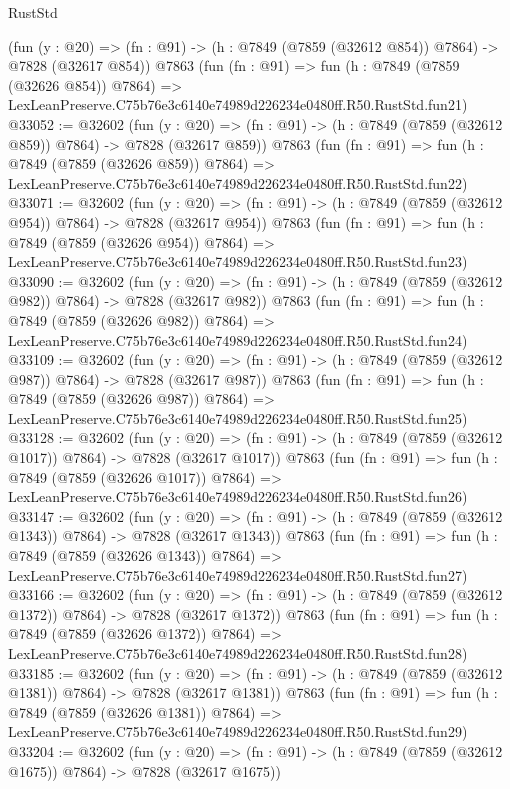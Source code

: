 \begin{lexlean}{RustStd}
\begin{coremodule}
    (fun (y : @20) => (fn : @91) -> (h : @7849 (@7859 (@32612 @854)) @7864) -> @7828 (@32617 @854))
    @7863
    (fun (fn : @91) =>
    fun (h : @7849 (@7859 (@32626 @854)) @7864) =>
    LexLeanPreserve.C75b76e3c6140e74989d226234e0480ff.R50.RustStd.fun21)
@33052 := @32602
    (fun (y : @20) => (fn : @91) -> (h : @7849 (@7859 (@32612 @859)) @7864) -> @7828 (@32617 @859))
    @7863
    (fun (fn : @91) =>
    fun (h : @7849 (@7859 (@32626 @859)) @7864) =>
    LexLeanPreserve.C75b76e3c6140e74989d226234e0480ff.R50.RustStd.fun22)
@33071 := @32602
    (fun (y : @20) => (fn : @91) -> (h : @7849 (@7859 (@32612 @954)) @7864) -> @7828 (@32617 @954))
    @7863
    (fun (fn : @91) =>
    fun (h : @7849 (@7859 (@32626 @954)) @7864) =>
    LexLeanPreserve.C75b76e3c6140e74989d226234e0480ff.R50.RustStd.fun23)
@33090 := @32602
    (fun (y : @20) => (fn : @91) -> (h : @7849 (@7859 (@32612 @982)) @7864) -> @7828 (@32617 @982))
    @7863
    (fun (fn : @91) =>
    fun (h : @7849 (@7859 (@32626 @982)) @7864) =>
    LexLeanPreserve.C75b76e3c6140e74989d226234e0480ff.R50.RustStd.fun24)
@33109 := @32602
    (fun (y : @20) => (fn : @91) -> (h : @7849 (@7859 (@32612 @987)) @7864) -> @7828 (@32617 @987))
    @7863
    (fun (fn : @91) =>
    fun (h : @7849 (@7859 (@32626 @987)) @7864) =>
    LexLeanPreserve.C75b76e3c6140e74989d226234e0480ff.R50.RustStd.fun25)
@33128 := @32602
    (fun (y : @20) =>
    (fn : @91) -> (h : @7849 (@7859 (@32612 @1017)) @7864) -> @7828 (@32617 @1017))
    @7863
    (fun (fn : @91) =>
    fun (h : @7849 (@7859 (@32626 @1017)) @7864) =>
    LexLeanPreserve.C75b76e3c6140e74989d226234e0480ff.R50.RustStd.fun26)
@33147 := @32602
    (fun (y : @20) =>
    (fn : @91) -> (h : @7849 (@7859 (@32612 @1343)) @7864) -> @7828 (@32617 @1343))
    @7863
    (fun (fn : @91) =>
    fun (h : @7849 (@7859 (@32626 @1343)) @7864) =>
    LexLeanPreserve.C75b76e3c6140e74989d226234e0480ff.R50.RustStd.fun27)
@33166 := @32602
    (fun (y : @20) =>
    (fn : @91) -> (h : @7849 (@7859 (@32612 @1372)) @7864) -> @7828 (@32617 @1372))
    @7863
    (fun (fn : @91) =>
    fun (h : @7849 (@7859 (@32626 @1372)) @7864) =>
    LexLeanPreserve.C75b76e3c6140e74989d226234e0480ff.R50.RustStd.fun28)
@33185 := @32602
    (fun (y : @20) =>
    (fn : @91) -> (h : @7849 (@7859 (@32612 @1381)) @7864) -> @7828 (@32617 @1381))
    @7863
    (fun (fn : @91) =>
    fun (h : @7849 (@7859 (@32626 @1381)) @7864) =>
    LexLeanPreserve.C75b76e3c6140e74989d226234e0480ff.R50.RustStd.fun29)
@33204 := @32602
    (fun (y : @20) =>
    (fn : @91) -> (h : @7849 (@7859 (@32612 @1675)) @7864) -> @7828 (@32617 @1675))

\end{coremodule}
\end{lexlean}
